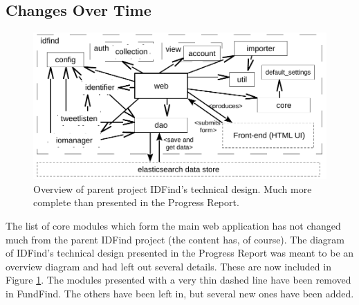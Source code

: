 \subsection{Changes Over Time}
\label{design-changes}

\begin{figure}[H]
\centering
\includegraphics[width=1.00\textwidth,]{Chapter3/idfind-new-uml.pdf}
\caption{Overview of parent project IDFind's technical design. Much more complete than presented in the Progress Report.}
\label{fig:idfind-new-uml}
\end{figure}

The list of core modules which form the main web application has not changed much from the parent IDFind project (the content has, of course). The diagram of IDFind's technical design presented in the Progress Report \cite{progress-report} was meant to be an overview diagram and had left out several details. These are now included in Figure \ref{fig:idfind-new-uml}. The modules presented with a very thin dashed line have been removed in FundFind. The others have been left in, but several new ones have been added.

